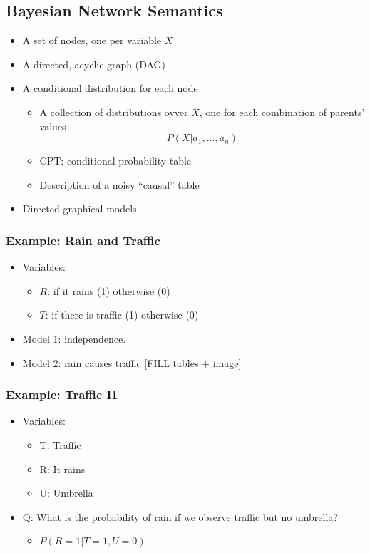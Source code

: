 \documentclass[10pt]{article}
\begin{document}
\subsection*{Bayesian Network Semantics}
\begin{itemize}
	\item A set of nodes, one per variable $X$
	\item A directed, acyclic graph (DAG)
	\item A conditional distribution for each node
	\begin{itemize}
	    \item A collection of distributions ovver $X$, one for each combination of parents' values
	    \[P(X | a_1, \dots, a_n)\]
        \item CPT: conditional probability table
        \item Description of a noisy ``causal'' table
    \end{itemize}
    \item Directed graphical models
\end{itemize}

\subsubsection*{Example: Rain and Traffic}
\begin{itemize}
	\item Variables: 
	\begin{itemize}
	    \item $R$: if it rains (1) otherwise (0)
	    \item $T$: if there is traffic (1) otherwise (0)
    \end{itemize}
    \item Model 1: independence.
    \item Model 2: rain causes traffic
    [FILL tables + image]
\end{itemize}

\subsubsection*{Example: Traffic II}
\begin{itemize}
	\item Variables:
	\begin{itemize}
	    \item T: Traffic
	    \item R: It rains
	    \item U: Umbrella
    \end{itemize}
    \item Q: What is the probability of rain if we observe traffic but no umbrella?
    \begin{itemize}
	    \item $P(R = 1 | T = 1, U = 0)$
    \end{itemize}
\end{itemize}
\end{document}
